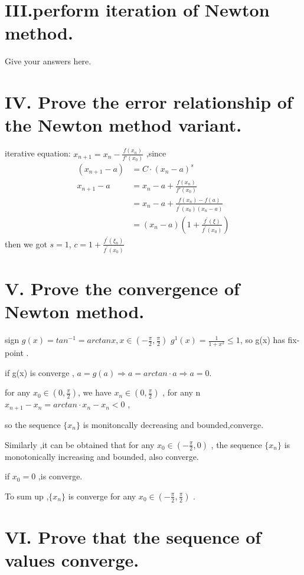 \documentclass[a4paper]{article}
\begin{document}
\section*{III.perform iteration of Newton method.}

Give your answers here.

\section*{IV. Prove the error relationship of the Newton method variant.}

iterative equation: $x_{n+1} = x_{n} - \frac{f(x_{n})}{f'(x_{0})}$ ,since
\begin{align}
   (x_{n+1}-a) & =C \cdot (x_{n}-a)^{s} \\
  x_{n+1}-a & = x_{n}-a+ \frac{f(x_{n})}{f'(x_{0})} \\
  & = x_{n} - a + \frac{f(x_{n})-f(a)}{f^{'}(x_{0})(x_{n}-a)} \\
  & = (x_{n}-a)(1+\frac{f^{'}(\xi)}{f^{'}(x_{0})})
\end{align}
then we got $s=1$, $c=1+\frac{f^{'}(\xi_{n})}{f^{'}(x_{0})}$


\section*{V. Prove the convergence of Newton method.}

\hspace{0.45cm} sign $g(x) = tan^{-1} = arctanx , x \in (-\frac{\pi}{2},\frac{\pi}{2})$
$g^{1}(x) = \frac{1}{1+x^2} \leq 1 $, so g(x) has fix-point .

if g(x) is converge , $a = g(a) \Rightarrow a=arctan \cdot a \Rightarrow a=0 $.

for any $x_{0} \in (0,\frac{\pi}{2})$, we have $x_{n} \in (0,\frac{\pi}{2})$ ,
for any n $x_{n+1}-x_{n} = arctan \cdot x_{n} - x_{n} < 0 $ , 

so the sequence  $\{x_{n}\}$ is monitoncally decreasing and bounded,converge.

Similarly ,it can be obtained that for any $x_{0} \in (-\frac{\pi}{2},0)$ ,
the sequence $\{x_{n}\}$ is monotonically increasing and bounded, also converge.

if $x_{0}=0$ ,is converge.

To sum up ,$\{x_{n}\}$ is converge for any $x_{0} \in (-\frac{\pi}{2},\frac{\pi}{2})$ .

\section*{VI. Prove that the sequence of values converge.}
\end{document}
